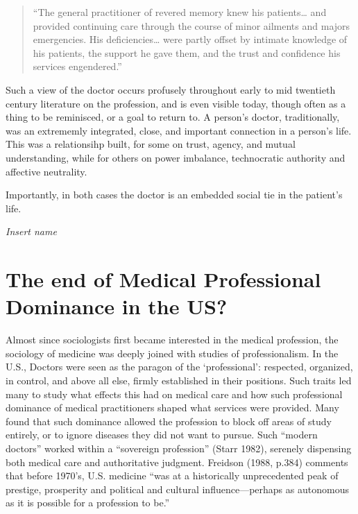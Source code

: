 \documentclass[12pt,twoside]{reedthesis}
\begin{document}
  \singlespace
  
  \begin{quote}
  ``The general practitioner of revered memory knew his patients\ldots{}
  and provided continuing care through the course of minor ailments and
  majors emergencies. His deficiencies\ldots{} were partly offset by
  intimate knowledge of his patients, the support he gave them, and the
  trust and confidence his services engendered.''
  \end{quote}
  
  \onehalfspacing
  
  Such a view of the doctor occurs profusely throughout early to mid
  twentieth century literature on the profession, and is even visible
  today, though often as a thing to be reminisced, or a goal to return to.
  A person's doctor, traditionally, was an extrememly integrated, close,
  and important connection in a person's life. This was a relationsihp
  built, for some on trust, agency, and mutual understanding, while for
  others on power imbalance, technocratic authority and affective
  neutrality.
  
  Importantly, in both cases the doctor is an embedded social tie in the
  patient's life.
  
  \emph{Insert name}
  
  \section*{The end of Medical Professional Dominance in the
  US?}\label{the-end-of-medical-professional-dominance-in-the-us}
  
  Almost since sociologists first became interested in the medical
  profession, the sociology of medicine was deeply joined with studies of
  professionalism. In the U.S., Doctors were seen as the paragon of the
  `professional': respected, organized, in control, and above all else,
  firmly established in their positions. Such traits led many to study
  what effects this had on medical care and how such professional
  dominance of medical practitioners shaped what services were provided.
  Many found that such dominance allowed the profession to block off areas
  of study entirely, or to ignore diseases they did not want to pursue.
  Such ``modern doctors'' worked within a ``sovereign profession'' (Starr
  1982), serenely dispensing both medical care and authoritative judgment.
  Freidson (1988, p.384) comments that before 1970's, U.S. medicine ``was
  at a historically unprecedented peak of prestige, prosperity and
  political and cultural influence---perhaps as autonomous as it is
  possible for a profession to be.''
  
\end{document}
